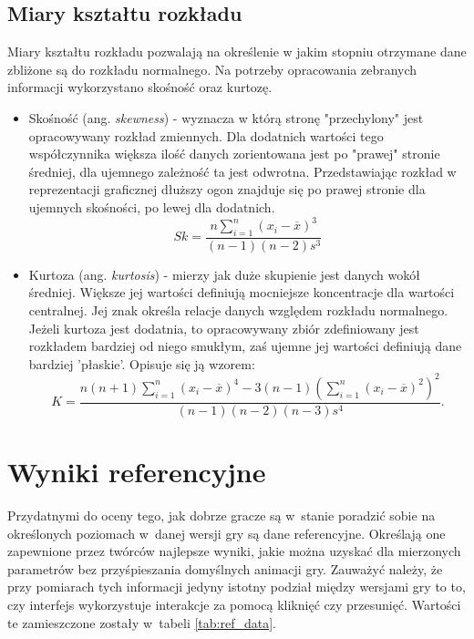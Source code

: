 \documentclass[a4paper,12pt,numbers=noenddot]{report}
\begin{document}
\subsection{Miary kształtu rozkładu}
Miary kształtu rozkładu pozwalają na określenie w jakim stopniu otrzymane dane zbliżone są do rozkładu normalnego. Na potrzeby opracowania zebranych informacji wykorzystano skośność oraz kurtozę.

\begin{itemize}
\item
Skośność (ang. \textit{skewness}) - wyznacza w którą stronę "przechylony" jest opracowywany rozkład zmiennych. Dla dodatnich wartości tego współczynnika większa ilość danych zorientowana jest po "prawej" stronie średniej, dla ujemnego zależność ta jest odwrotna. Przedstawiając rozkład w reprezentacji graficznej dłuższy ogon znajduje się po prawej stronie dla ujemnych skośności, po lewej dla dodatnich.
\begin{equation}
\label{eq_skew}
Sk = \frac{n\sum_{i=1}^{n}(x_i-\overline{x})^3}{(n-1)(n-2)s^3}
\end{equation}

\item
Kurtoza (ang. \textit{kurtosis}) - mierzy jak duże skupienie jest danych wokół średniej. Większe jej wartości definiują mocniejsze koncentracje dla wartości centralnej. Jej znak określa relacje danych względem rozkładu normalnego. Jeżeli kurtoza jest dodatnia, to opracowywany zbiór zdefiniowany jest rozkładem bardziej od niego smukłym, zaś ujemne jej wartości definiują dane bardziej 'płaskie'. Opisuje się ją wzorem:
\begin{equation}
\label{eq_kurtosis}
K = \frac{n(n+1)\sum_{i=1}^{n}(x_i-\overline{x})^4-3(n-1)(\sum_{i=1}^{n}(x_i-\overline{x})^2)^2}{(n-1)(n-2)(n-3)s^4}.
\end{equation}
\end{itemize}

\section{Wyniki referencyjne}
Przydatnymi do oceny tego, jak dobrze gracze są w~stanie poradzić sobie na określonych poziomach w~danej wersji gry są dane referencyjne. Określają one zapewnione przez twórców najlepsze wyniki, jakie można uzyskać dla mierzonych parametrów bez przyśpieszania domyślnych animacji gry. Zauważyć należy, że przy pomiarach tych informacji jedyny istotny podział między wersjami gry to to, czy interfejs wykorzystuje interakcje za pomocą kliknięć czy przesunięć. Wartości te zamieszczone zostały w~tabeli \ref{tab:ref_data}.
\end{document}
